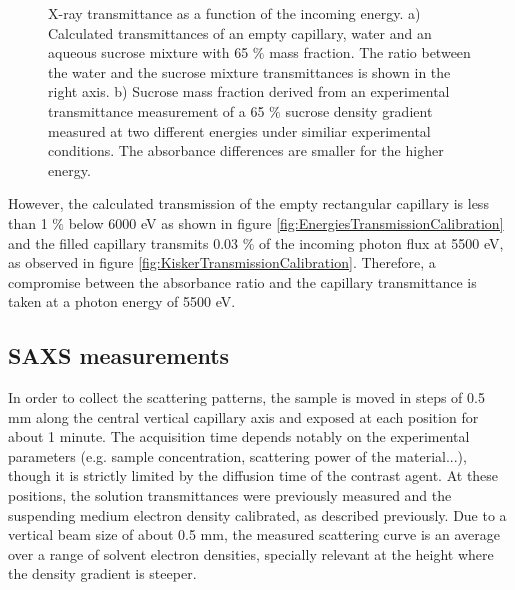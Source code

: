 \begin{figure}%
	\centering
	\caption{X-ray transmittance as a function of the incoming energy. a) Calculated transmittances \cite{henke_x-ray_1993} of an empty capillary, water and an aqueous sucrose mixture with 65 $\%$ mass fraction. The ratio between the water and the sucrose mixture transmittances is shown in the right axis. b) Sucrose mass fraction derived from an experimental transmittance measurement of a 65 $\%$ sucrose density gradient measured at two different energies under similiar experimental conditions. The absorbance differences are smaller for the higher energy.}

\end{figure}

However, the calculated transmission of the empty rectangular capillary is less than 1 $\%$ below 6000 eV as shown in figure \ref{fig:EnergiesTransmissionCalibration} and the filled capillary transmits 0.03 $\%$ of the incoming photon flux at 5500 eV, as observed in figure \ref{fig:KiskerTransmissionCalibration}. Therefore, a compromise between the absorbance ratio and the capillary transmittance is taken at a photon energy of 5500 eV. 

\subsection{SAXS measurements}
\label{sec:DensityGradientSAXS}

In order to collect the scattering patterns, the sample is moved in steps of 0.5 mm along the central vertical capillary axis and exposed at each position for about 1 minute. The acquisition time depends notably on the experimental parameters (e.g. sample concentration, scattering power of the material...), though it is strictly limited by the diffusion time of the contrast agent. At these positions, the solution transmittances were previously measured and the suspending medium electron density calibrated, as described previously. Due to a vertical beam size of about 0.5 mm, the measured scattering curve is an average over a range of solvent electron densities, specially relevant at the height where the density gradient is steeper. 

